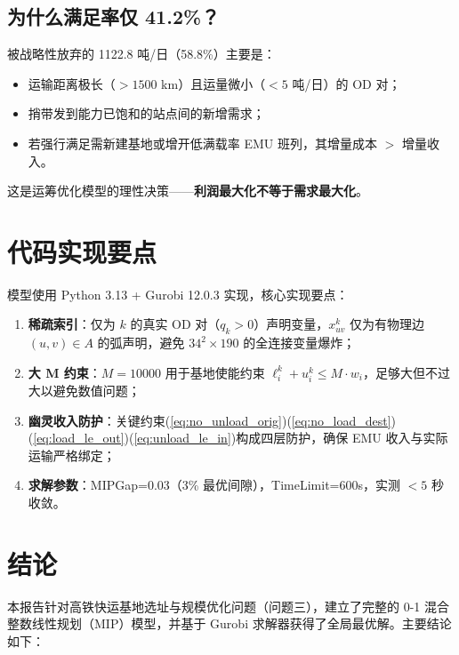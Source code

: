 \documentclass[12pt,a4paper,fontset=none]{ctexart}
\begin{document}
\subsection{为什么满足率仅 41.2\%？}

被战略性放弃的 1122.8 吨/日（58.8\%）主要是：
\begin{itemize}
    \item 运输距离极长（$>1500$ km）且运量微小（$<5$ 吨/日）的 OD 对；
    \item 捎带发到能力已饱和的站点间的新增需求；
    \item 若强行满足需新建基地或增开低满载率 EMU 班列，其增量成本 $>$ 增量收入。
\end{itemize}

这是运筹优化模型的理性决策——\textbf{利润最大化不等于需求最大化}。

\section{代码实现要点}

模型使用 Python 3.13 + Gurobi 12.0.3 实现，核心实现要点：

\begin{enumerate}[leftmargin=*]
    \item \textbf{稀疏索引}：仅为 $k$ 的真实 OD 对（$q_k>0$）声明变量，$x_{uv}^k$ 仅为有物理边 $(u,v)\in A$ 的弧声明，避免 $34^2\times 190$ 的全连接变量爆炸；
    \item \textbf{大 M 约束}：$M=10000$ 用于基地使能约束 $\ell_i^k+u_i^k\le M\cdot w_i$，足够大但不过大以避免数值问题；
    \item \textbf{幽灵收入防护}：关键约束(\ref{eq:no_unload_orig})(\ref{eq:no_load_dest})(\ref{eq:load_le_out})(\ref{eq:unload_le_in})构成四层防护，确保 EMU 收入与实际运输严格绑定；
    \item \textbf{求解参数}：MIPGap=0.03（3\% 最优间隙），TimeLimit=600s，实测 $<5$ 秒收敛。
\end{enumerate}

\section{结论}

本报告针对高铁快运基地选址与规模优化问题（问题三），建立了完整的 0-1 混合整数线性规划（MIP）模型，并基于 Gurobi 求解器获得了全局最优解。主要结论如下：
\end{document}
